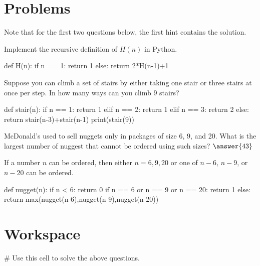 \documentclass{ximera}
\begin{document}
\section{Problems}

Note that for the first two questions below, the first hint contains the solution.

\begin{question}
Implement the recursive definition of $H(n)$ in Python.
	\begin{hint}
\begin{sageCell}
def H(n):
        if n == 1:
                return 1
        else:
		return 2*H(n-1)+1
\end{sageCell}
	\end{hint}
\end{question}

\begin{question}
Suppose you can climb a set of stairs by either taking one stair or three stairs at once per step. In how many ways can you climb 9 stairs?
	\begin{hint}
\begin{sageCell}
def stair(n):
        if n == 1:
                return 1
        elif n == 2:
                return 1
        elif n == 3:
                return 2
        else:
                return stair(n-3)+stair(n-1)
print(stair(9))
\end{sageCell}
\end{hint}
\end{question}

\begin{question}
McDonald's used to sell nuggets only in packages of size 6, 9, and 20. What is the largest number of nuggest that cannot be ordered using such sizes? $\answer{43}$
	\begin{hint}
If a number $n$ can be ordered, then either $n=6,9,20$ or one of $n-6$, $n-9$, or $n-20$ can be ordered.
	\end{hint}
	\begin{hint}
\begin{sageCell}
def nugget(n):
        if n < 6:
                return 0
        if n == 6 or n == 9 or n == 20:
                return 1
        else:
                return max(nugget(n-6),nugget(n-9),nugget(n-20))
\end{sageCell}
	\end{hint}
\end{question}

\section{Workspace}

\begin{sageCell}
# Use this cell to solve the above questions.
\end{sageCell}
\end{document}

